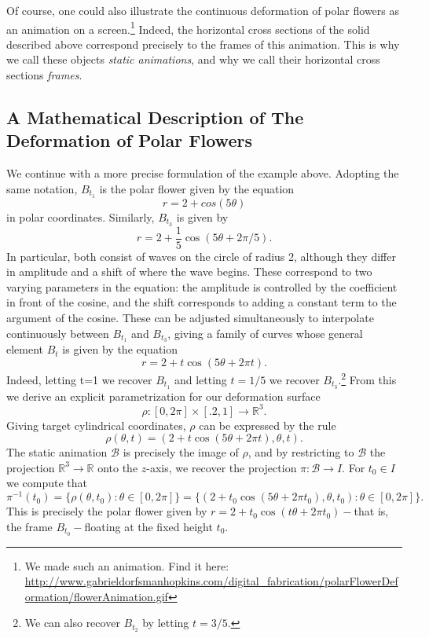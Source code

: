 \documentclass[12 pt]{article}
\newcommand{\bR}{\mathbb{R}}
\newcommand{\cB}{\mathcal{B}}
\begin{document}
Of course, one could also illustrate the continuous deformation of polar flowers as an animation on a screen.\footnote{We made such an animation.  Find it here: \url{http://www.gabrieldorfsmanhopkins.com/digital_fabrication/polarFlowerDeformation/flowerAnimation.gif}}  Indeed, the horizontal cross sections of the solid described above correspond precisely to the frames of this animation.  This is why we call these objects \textit{static animations}, and why we call their horizontal cross sections \textit{frames}.\\

\subsection{A Mathematical Description of The Deformation of Polar Flowers}\label{preciseTheory}
We continue with a more precise formulation of the example above.  Adopting the same notation, $B_{t_1}$ is the polar flower given by the equation
\[r = 2 + cos(5\theta)\]
in polar coordinates.  Similarly, $B_{t_3}$ is given by
\[r = 2 + \frac{1}{5}\cos(5\theta + 2\pi/5).\]
In particular, both consist of waves on the circle of radius 2, although they differ in amplitude and a shift of where the wave begins.  These correspond to two varying parameters in the equation: the amplitude is controlled by the coefficient in front of the cosine, and the shift corresponds to adding a constant term to the argument of the cosine.  These can be adjusted simultaneously to interpolate continuously  between $B_{t_1}$ and $B_{t_3}$, giving a family of curves whose general element $B_t$ is given by the equation
\[r = 2 + t\cos(5\theta + 2\pi t).\]
Indeed, letting t=1 we recover $B_{t_1}$ and letting $t=1/5$ we recover $B_{t_3}.$\footnote{We can also recover $B_{t_2}$ by letting $t=3/5$.}  From this we derive an explicit parametrization for our deformation surface
\[\rho:[0,2\pi]\times[.2,1]\longrightarrow\bR^3.\]
Giving target cylindrical coordinates, $\rho$ can be expressed by the rule
\[\rho(\theta,t) = (2+t\cos(5\theta+2\pi t),\theta,t).\]
The static animation $\cB$ is precisely the image of $\rho$, and by restricting to $\cB$ the projection $\bR^3\to\bR$ onto the $z$-axis, we recover the projection $\pi:\cB\to I$.  For $t_0\in I$ we compute that
\[\pi^{-1}(t_0) = \{\rho(\theta,t_0):\theta\in[0,2\pi]\} = \{(2+t_0\cos(5\theta+2\pi t_0),\theta,t_0):\theta\in[0,2\pi]\}.\]
This is precisely the polar flower given by $r = 2+t_0\cos(t\theta+2\pi t_0)-$that is, the frame $B_{t_0}-$floating at the fixed height $t_0$.\\
\end{document}
